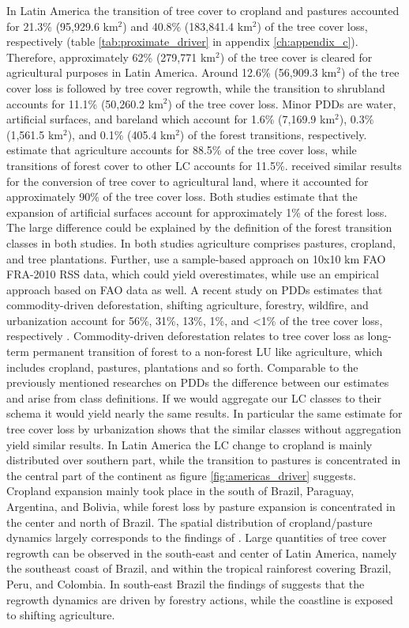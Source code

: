 			In Latin America the transition of tree cover to cropland and pastures accounted for 21.3\% (95,929.6 km$^2$) and 40.8\% (183,841.4 km$^2$) of the tree cover loss, respectively (table \ref{tab:proximate_driver} in appendix \ref{ch:appendix_c}). Therefore, approximately 62\% (279,771 km$^2$) of the tree cover is cleared for agricultural purposes in Latin America. Around 12.6\% (56,909.3 km$^2$) of the tree cover loss is followed by tree cover regrowth, while the transition to shrubland accounts for 11.1\% (50,260.2 km$^2$) of the tree cover loss. Minor \acp{PDD} are water, artificial surfaces, and bareland which account for 1.6\% (7,169.9 km$^2$), 0.3\% (1,561.5 km$^2$), and 0.1\% (405.4 km$^2$) of the forest transitions, respectively. \citet{Sy2015} estimate that agriculture accounts for 88.5\% of the tree cover loss, while transitions of forest cover to other \ac{LC} accounts for 11.5\%. \citet{Hosonuma2012} received similar results for the conversion of tree cover to agricultural land, where it accounted for approximately 90\% of the tree cover loss. Both studies estimate that the expansion of artificial surfaces account for approximately 1\% of the forest loss. The large difference could be explained by the definition of the forest transition classes in both studies. In both studies agriculture comprises pastures, cropland, and tree plantations. Further, \citet{Sy2015} use a sample-based approach on 10x10 km \ac{FAO} FRA-2010 RSS data, which could yield overestimates, while \citet{Hosonuma2012} use an empirical approach based on \ac{FAO} data as well. A recent study on \acp{PDD} estimates that commodity-driven deforestation, shifting agriculture, forestry, wildfire, and urbanization account for 56\%, 31\%, 13\%, 1\%, and <1\% of the tree cover loss, respectively \citep{Curtis2018}. Commodity-driven deforestation relates to tree cover loss as long-term permanent transition of forest to a non-forest \ac{LU} like agriculture, which includes cropland, pastures, plantations and so forth. Comparable to the previously mentioned researches on \acp{PDD} the difference between our estimates and \citet{Curtis2018} arise from class definitions. If we would aggregate our \ac{LC} classes to their schema it would yield nearly the same results. In particular the same estimate for tree cover loss by urbanization shows that the similar classes without aggregation yield similar results. In Latin America the \ac{LC} change to cropland is mainly distributed over southern part, while the transition to pastures is concentrated in the central part of the continent as figure \ref{fig:americas_driver} suggests. Cropland expansion mainly took place in the south of Brazil, Paraguay, Argentina, and Bolivia, while forest loss by pasture expansion is concentrated in the center and north of Brazil. The spatial distribution of cropland/pasture dynamics largely corresponds to the findings of \citet{Graesser2015}. Large quantities of tree cover regrowth can be observed in the south-east and center of Latin America, namely the southeast coast of Brazil, and within the tropical rainforest covering Brazil, Peru, and Colombia. In south-east Brazil the findings of \citet{Curtis2018} suggests that the regrowth dynamics are driven by forestry actions, while the coastline is exposed to shifting agriculture. 